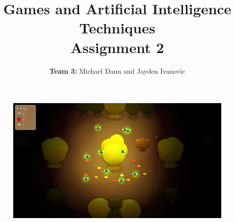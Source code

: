 \documentclass[11pt,a4paper,twoside]{article}
\title{Games and Artificial Intelligence Techniques \\ Assignment 2}
\author{\textbf{Team 3:} Michael Dann and Jayden Ivanovic}
\begin{document}
\maketitle
\begin{figure}[h]
\centering
\includegraphics[width=0.6\linewidth]{./splash}
\end{figure}




\end{document}
